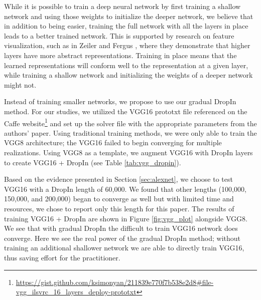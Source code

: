 \documentclass[10pt,twocolumn,letterpaper]{article}
\newcommand{\dropin}{DropIn }
\begin{document}

While it is possible to train a deep neural network by first training a shallow network and using those weights to initialize the deeper network, we believe that in addition to being easier, training the full network with all the layers in place leads to a better trained network.  This is supported by research on feature visualization, such as in Zeiler and Fergus \cite{zeiler2014visualizing}, where they demonstrate that higher layers have more abstract representations.
Training in place means that the learned representations will conform well to the representation at a given layer, while training a shallow network and initializing the weights of a deeper network might not.

Instead of training smaller networks, we propose to use our gradual DropIn method.  
For our studies, we utilized the VGG16 prototxt file referenced on the Caffe website\footnote{\url{https://gist.github.com/ksimonyan/211839e770f7b538e2d8\#file-vgg_ilsvrc_16_layers_deploy-prototxt}} 
and set up the solver file with the appropriate parameters from the authors' paper.  Using traditional training methods, we were only able to train the VGG8 architecture;  the VGG16 failed to begin converging for multiple realizations.  Using VGG8 as a template,  we augment VGG16 with \dropin layers to create VGG16 + \dropin (see Table \ref{tab:vgg_dropin}).  

Based on the evidence presented in Section \ref{sec:alexnet}, we choose to test VGG16 with a \dropin length of 60,000. We found that other lengths (100,000, 150,000, and 200,000) began to converge as well but with limited time and resources, we chose to report only this length for this paper.
The results of training VGG16 + \dropin are shown in Figure \ref{fig:vgg_plot} alongside VGG8.  We see that with gradual \dropin the difficult to train VGG16 network does converge.  Here we see the real power of the gradual \dropin method; without training an additional shallower network we are able to directly train VGG16,  thus saving effort for the practitioner. %
\end{document}
